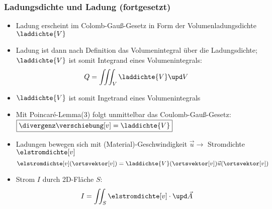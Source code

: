 \begin{frame}
  \frametitle{Ladungsdichte und Ladung (fortgesetzt)}
\begin{itemize}[<+->]
\item<1-> Ladung erscheint im Colomb-Gauß-Gesetz in Form der Volumenladungsdichte \(\laddichte{V} \)
\item<1-> Ladung ist dann nach Definition das Volumenintegral über die Ladungsdichte; \(\laddichte{V} \) ist somit Integrand eines Volumenintegrals:
  \begin{equation*}
    Q = \iiint_V \laddichte{V} \upd V
  \end{equation*}
\item \(\laddichte{V} \) ist somit Ingetrand eines Volumenintegrals
  \item Mit Poincaré-Lemma(3) folgt unmittelbar das Coulomb-Gauß-Gesetz: \( \boxed{\divergenz\verschiebung[v] = \laddichte{V} }\)
  \item Ladungen bewegen sich mit (Material)-Geschwindigkeit \(\vec{u} \to\) Stromdichte \(\elstromdichte[v]\)
    \begin{equation*}
\elstromdichte[v](\ortsvektor[v]) = \laddichte{V}(\ortsvektor[v])\vec{u}(\ortsvektor[v])
\end{equation*}
\item Strom \(I\) durch 2D-Fläche \(S\):
  \begin{equation*}
    I = \iint_S \elstromdichte[v] \cdot \upd\vec{A}
    \end{equation*}
\end{itemize}
\end{frame}


